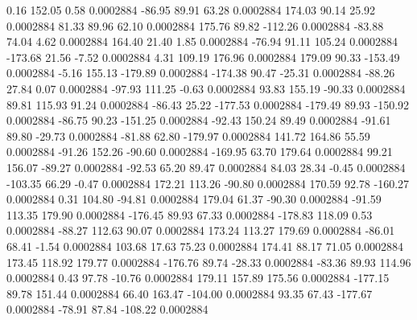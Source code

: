        0.16      152.05        0.58     0.0002884
      -86.95       89.91       63.28     0.0002884
      174.03       90.14       25.92     0.0002884
       81.33       89.96       62.10     0.0002884
      175.76       89.82     -112.26     0.0002884
      -83.88       74.04        4.62     0.0002884
      164.40       21.40        1.85     0.0002884
      -76.94       91.11      105.24     0.0002884
     -173.68       21.56       -7.52     0.0002884
        4.31      109.19      176.96     0.0002884
      179.09       90.33     -153.49     0.0002884
       -5.16      155.13     -179.89     0.0002884
     -174.38       90.47      -25.31     0.0002884
      -88.26       27.84        0.07     0.0002884
      -97.93      111.25       -0.63     0.0002884
       93.83      155.19      -90.33     0.0002884
       89.81      115.93       91.24     0.0002884
      -86.43       25.22     -177.53     0.0002884
     -179.49       89.93     -150.92     0.0002884
      -86.75       90.23     -151.25     0.0002884
      -92.43      150.24       89.49     0.0002884
      -91.61       89.80      -29.73     0.0002884
      -81.88       62.80     -179.97     0.0002884
      141.72      164.86       55.59     0.0002884
      -91.26      152.26      -90.60     0.0002884
     -169.95       63.70      179.64     0.0002884
       99.21      156.07      -89.27     0.0002884
      -92.53       65.20       89.47     0.0002884
       84.03       28.34       -0.45     0.0002884
     -103.35       66.29       -0.47     0.0002884
      172.21      113.26      -90.80     0.0002884
      170.59       92.78     -160.27     0.0002884
        0.31      104.80      -94.81     0.0002884
      179.04       61.37      -90.30     0.0002884
      -91.59      113.35      179.90     0.0002884
     -176.45       89.93       67.33     0.0002884
     -178.83      118.09        0.53     0.0002884
      -88.27      112.63       90.07     0.0002884
      173.24      113.27      179.69     0.0002884
      -86.01       68.41       -1.54     0.0002884
      103.68       17.63       75.23     0.0002884
      174.41       88.17       71.05     0.0002884
      173.45      118.92      179.77     0.0002884
     -176.76       89.74      -28.33     0.0002884
      -83.36       89.93      114.96     0.0002884
        0.43       97.78      -10.76     0.0002884
      179.11      157.89      175.56     0.0002884
     -177.15       89.78      151.44     0.0002884
       66.40      163.47     -104.00     0.0002884
       93.35       67.43     -177.67     0.0002884
      -78.91       87.84     -108.22     0.0002884
